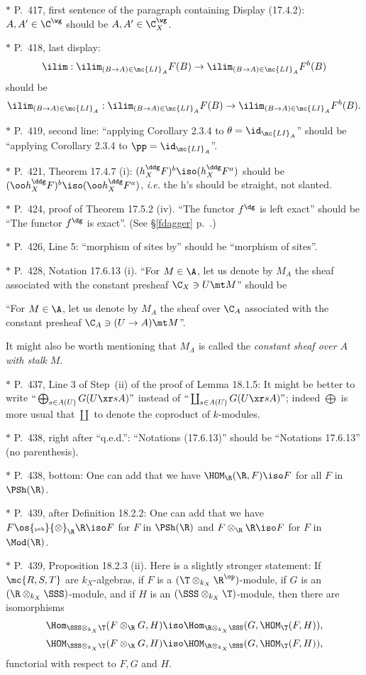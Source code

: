 \documentclass[12pt]{article}
\theoremstyle{remark}
\theoremstyle{definition}
\begin{document}
\nn$*$ P.~417, first sentence of the paragraph containing Display (17.4.2): $A,A'\in\C^\wg$ should be $A,A'\in\C_X^\wg$. 

\nn$*$ P.~418, last display: 
$$
\ilim:\ilim_{(B\to A)\in\mc{LI}_A}F(B)\to\ilim_{(B\to A)\in\mc{LI}_A}F^b(B)
$$ 
should be 
$$
\ilim_{(B\to A)\in\mc{LI}_A}:\ilim_{(B\to A)\in\mc{LI}_A}F(B)\to\ilim_{(B\to A)\in\mc{LI}_A}F^b(B).
$$

\nn$*$ P.~419, second line: ``applying Corollary 2.3.4 to $\theta=\id_{\mc{LI}_A}$'' should be ``applying Corollary 2.3.4 to $\pp=\id_{\mc{LI}_A}$''.

\nn$*$ P.~421, Theorem 17.4.7 (i): $(h_X^\ddg F)^b\iso(h_X^\ddg F^a)$ should be $(\oo h_X^\ddg F)^b\iso(\oo h_X^\ddg F^a)$, \emph{i.e.} the h's should be straight, not slanted.

\nn$*$ P.~424, proof of Theorem 17.5.2 (iv). ``The functor $f^\dg$ is left exact'' should be ``The functor $f^\dg$ is exact''. (See \S\ref{fdagger} p.~.) 

\nn$*$ P.~426, Line 5: ``morphism of sites by'' should be ``morphism of sites''.

\nn$*$ P.~428, Notation 17.6.13 (i). ``For $M\in\A$, let us denote by $M_A$ the sheaf associated with the constant presheaf $\C_X\ni U\mt M$'' should be  

``For $M\in\A$, let us denote by $M_A$ the sheaf over $\C_A$ associated with the constant presheaf $\C_A\ni(U\to A)\mt M$''. 

It might also be worth mentioning that $M_A$ is called the \emph{constant sheaf over $A$ with stalk} $M$. 

\nn$*$ P.~437, Line 3 of Step~(ii) of the proof of Lemma 18.1.5: It might be better to write $``\bigoplus_{s\in A(U)}G(U\xr sA)"$ instead of $``\coprod_{s\in A(U)}G(U\xr sA)"$; indeed $\bigoplus$ is more usual that $\coprod$ to denote the coproduct of $k$-modules. 

\nn$*$ P.~438, right after ``q.e.d.'': ``Notations (17.6.13)'' should be ``Notations 17.6.13'' (no parenthesis). 

\nn$*$ P.~438, bottom: One can add that we have $\HOM_\R(\R,F)\iso F$ for all $F$ in $\PSh(\R)$. 

\nn$*$ P.~439, after Definition 18.2.2: One can add that we have $F\os{\text{\tiny psh}}{\otimes}_\R\R\iso F$ for $F$ in $\PSh(\R)$ and $F\otimes_\R\R\iso F$ for $F$ in $\Mod(\R)$. 

\nn$*$ P.~439, Proposition 18.2.3 (ii). Here is a slightly stronger statement: If $\mc{R,S,T}$ are $k_X$-algebras, if $F$ is a $(\T\otimes_{k_X}\R^{\op})$-module, if $G$ is an $(\R\otimes_{k_X}\SSS)$-module, and if $H$ is an $(\SSS\otimes_{k_X}\T)$-module, then there are isomorphisms 
$$
\Hom_{\SSS\otimes_{k_X}\T}(F\otimes_\R G,H)\iso
\Hom_{\R\otimes_{k_X}\SSS}(G,\HOM_\T(F,H)), 
$$ 
$$
\HOM_{\SSS\otimes_{k_X}\T}(F\otimes_\R G,H)\iso
\HOM_{\R\otimes_{k_X}\SSS}(G,\HOM_\T(F,H)), 
$$ 
functorial with respect to $F,G$ and $H$.
\end{document}
